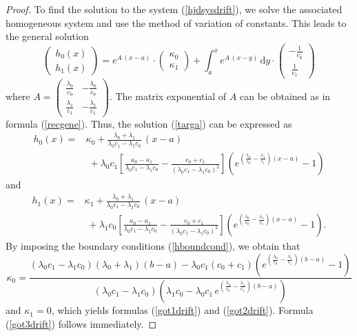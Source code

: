 \documentclass{article}
\begin{document}
\begin{proof}
To find the solution to the system (\ref{hjdsysdrift}), we solve the associated homogeneous system and use the method of variation of constants. This leads to the general solution
\begin{equation}\label{targa}
\begin{pmatrix}h_0(x)\\[0.3em]h_1(x)\end{pmatrix}=e^{A\,(x-a)}\cdot\begin{pmatrix}\kappa_0\\[0.3em]\kappa_1\end{pmatrix}+\int_a^x e^{A\,(x-y)}\,\mathrm{d}y\cdot \begin{pmatrix}-\frac{1}{c_0}\\[0.3em]\;\frac{1}{c_1}\end{pmatrix}\end{equation} where $A=\begin{pmatrix}\frac{\lambda_0}{c_0} & -\frac{\lambda_0}{c_0}\\[0.5em]\frac{\lambda_1}{c_1} & -\frac{\lambda_1}{c_1}\end{pmatrix}$. The matrix exponential of $A$ can be obtained as in formula  (\ref{recgene}). Thus, the solution (\ref{targa}) can be expressed as
\begin{align}h_0(x)=&\kappa_0+\frac{\lambda_0+\lambda_1}{\lambda_0c_1-\lambda_1c_0}\,(x-a)\nonumber\\
&\;+\lambda_0c_1\left[\frac{\kappa_0-\kappa_1}{\lambda_0c_1-\lambda_1c_0}-\frac{c_0+c_1}{(\lambda_0c_1-\lambda_1c_0)^2}\right]\left(e^{\left(\frac{\lambda_0}{c_0}-\frac{\lambda_1}{c_1}\right)(x-a)}-1\right)\nonumber\end{align}
and
\begin{align}h_1(x)=&\kappa_1+\frac{\lambda_0+\lambda_1}{\lambda_0c_1-\lambda_1c_0}\,(x-a)\nonumber\\
&\;+\lambda_1c_0\left[\frac{\kappa_0-\kappa_1}{\lambda_0c_1-\lambda_1c_0}-\frac{c_0+c_1}{(\lambda_0c_1-\lambda_1c_0)^2}\right]\left(e^{\left(\frac{\lambda_0}{c_0}-\frac{\lambda_1}{c_1}\right)(x-a)}-1\right).\nonumber\end{align}
By imposing the boundary conditions (\ref{hboundcond}), we obtain that
$$\kappa_0=\frac{(\lambda_0c_1-\lambda_1c_0)(\lambda_0+\lambda_1)(b-a)-\lambda_0c_1(c_0+c_1)\left(e^{\left(\frac{\lambda_0}{c_0}-\frac{\lambda_1}{c_1}\right)(b-a)}-1\right)}{(\lambda_0c_1-\lambda_1c_0)\left(\lambda_1c_0-\lambda_0c_1\,e^{\left(\frac{\lambda_0}{c_0}-\frac{\lambda_1}{c_1}\right)(b-a)}\right)}$$ and $\kappa_1=0$, which yields formulas (\ref{got1drift}) and (\ref{got2drift}). Formula (\ref{got3drift}) follows immediately.
\end{proof}
\end{document}
